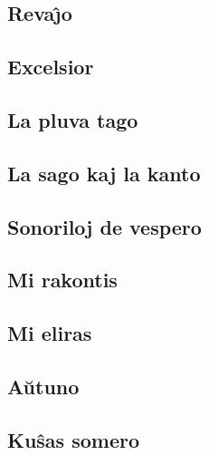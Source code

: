 \documentclass[a5paper,11pt,openany,twoside]{book}
\begin{document}
\vspace*{-5ex} %

\subsection{Reva\^{\j}o}
\label{revajxo}


\vspace*{-5ex} %

\subsection{Excelsior}
\label{excelsior}

\subsection{La pluva tago}
\label{pluva}

\subsection{La sago kaj la kanto}
\label{sago}

\subsection{Sonoriloj de vespero}
\label{sonoriloj}


\subsection{Mi rakontis}
\label{rakontis}

\vspace*{-5ex} %

\subsection{Mi eliras}
\label{eliras}


\subsection{A\u utuno}
\label{auxtuno}


\subsection{Ku\^sas somero}
\label{somero}

\end{document}
